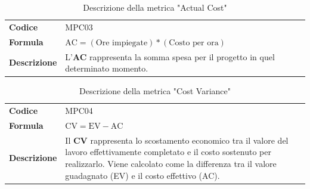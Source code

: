 \documentclass[a4paper,12pt]{article}
\begin{document}
            {\renewcommand{\arraystretch}{1.4}
            \begin{table}[H]
            \centering
            \begin{tabularx}{\textwidth}{|l|X|}
                \hline
                \rowcolor{gold}
                \multicolumn{2}{|c|}{\textbf{Actual Cost (AC)}}\\
                \hline
                \textbf{Codice} & MPC03\\
                \hline
                \textbf{Formula} & \( \displaystyle \text{AC} = (\text{Ore impiegate})*(\text{Costo per ora}) \)\\
                \hline
                \textbf{Descrizione} & L'\textbf{AC} rappresenta la somma spesa per il progetto in quel determinato momento. \\
                \hline
            \end{tabularx}      
            \caption{Descrizione della metrica "Actual Cost"}
            \end{table}
            }
            
            
            {\renewcommand{\arraystretch}{1.4}
            \begin{table}[H]
            \centering
            \begin{tabularx}{\textwidth}{|l|X|}
                \hline
                \rowcolor{gold}
                \multicolumn{2}{|c|}{\textbf{Cost Variance (CV)}}\\
                \hline
                \textbf{Codice} & MPC04\\
                \hline
                \textbf{Formula} & \( \displaystyle \text{CV} = \text{EV}-\text{AC} \)\\
                \hline
                \textbf{Descrizione} & Il \textbf{CV} rappresenta lo scostamento economico tra il valore del lavoro effettivamente completato e il costo sostenuto per realizzarlo. Viene calcolato come la differenza tra il valore guadagnato (EV) e il costo effettivo (AC). \\
                \hline
            \end{tabularx}      
            \caption{Descrizione della metrica "Cost Variance"}
            \end{table}
            }
    
\end{document}
